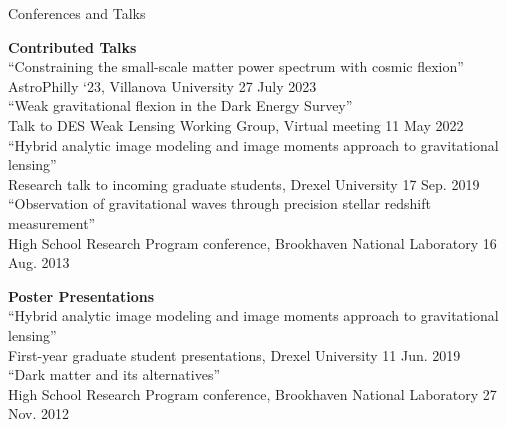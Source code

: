 \documentclass{resume} %
\newcommand{\forceindent}{\leavevmode{\parindent=1em\indent}}
\begin{document}
\begin{rSection}{Conferences and Talks}

\textbf{Contributed Talks}\\
``Constraining the small-scale matter power spectrum with cosmic flexion''\\
\forceindent AstroPhilly `23, Villanova University \hfill 27 July 2023\\
``Weak gravitational flexion in the Dark Energy Survey''\\
\forceindent Talk to DES Weak Lensing Working Group, Virtual meeting \hfill 11 May 2022\\
``Hybrid analytic image modeling and image moments approach to gravitational lensing''\\
\forceindent Research talk to incoming graduate students, Drexel University \hfill 17 Sep. 2019\\
``Observation of gravitational waves through precision stellar redshift measurement''\\
\forceindent High School Research Program conference, Brookhaven National Laboratory \hfill 16 Aug. 2013

\textbf{Poster Presentations}\\
``Hybrid analytic image modeling and image moments approach to gravitational lensing''\\
\forceindent First-year graduate student presentations, Drexel University \hfill 11 Jun. 2019\\
``Dark matter and its alternatives''\\
\forceindent High School Research Program conference, Brookhaven National Laboratory \hfill 27 Nov. 2012

\end{rSection}

\end{document}
